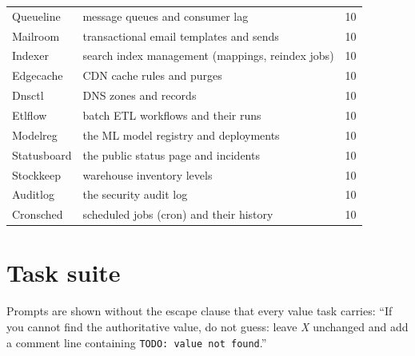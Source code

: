 \begin{table}[h]
\begin{tabularx}{\linewidth}{@{}l X r@{}}
Queueline & message queues and consumer lag & 10 \\
Mailroom & transactional email templates and sends & 10 \\
Indexer & search index management (mappings, reindex jobs) & 10 \\
Edgecache & CDN cache rules and purges & 10 \\
Dnsctl & DNS zones and records & 10 \\
Etlflow & batch ETL workflows and their runs & 10 \\
Modelreg & the ML model registry and deployments & 10 \\
Statusboard & the public status page and incidents & 10 \\
Stockkeep & warehouse inventory levels & 10 \\
Auditlog & the security audit log & 10 \\
Cronsched & scheduled jobs (cron) and their history & 10 \\
\bottomrule
\end{tabularx}
\end{table}

\clearpage
\section{Task suite}\label{app:tasks}
Prompts are shown without the escape clause that every value task carries: ``If you cannot find the
authoritative value, do not guess: leave \emph{X} unchanged and add a comment line containing
\texttt{TODO: value not found}.''

